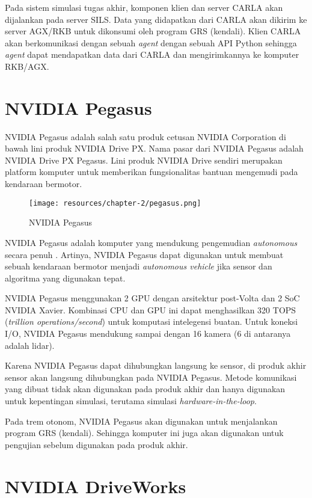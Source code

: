 Pada sistem simulasi tugas akhir, komponen klien dan server CARLA akan
dijalankan pada server SILS. Data yang didapatkan dari CARLA akan dikirim ke
server AGX/RKB untuk dikonsumi oleh program GRS (kendali). Klien CARLA akan
berkomunikasi dengan sebuah \textit{agent} dengan sebuah API Python sehingga
\textit{agent} dapat mendapatkan data dari CARLA dan mengirimkannya ke komputer
RKB/AGX.

\section{NVIDIA Pegasus}\label{chapter-2-section-pegasus}

NVIDIA Pegasus adalah salah satu produk cetusan NVIDIA Corporation di bawah lini
produk NVIDIA Drive PX. Nama pasar dari NVIDIA Pegasus adalah NVIDIA Drive
PX Pegasus. Lini produk NVIDIA Drive sendiri merupakan platform komputer untuk
memberikan fungsionalitas bantuan mengemudi pada kendaraan bermotor.

\begin{figure}[!htbp]
	\centering
	\texttt{[image: resources/chapter-2/pegasus.png]}
	\caption{NVIDIA Pegasus \parencite{trilaksono_laporanRispro}}
\end{figure}

NVIDIA Pegasus adalah komputer yang mendukung pengemudian \textit{autonomous}
secara penuh \parencite{oh_2017}. Artinya, NVIDIA Pegasus dapat digunakan untuk
membuat sebuah kendaraan bermotor menjadi \textit{autonomous vehicle} jika
sensor dan algoritma yang digunakan tepat.

NVIDIA Pegasus menggunakan 2 GPU dengan arsitektur post-Volta dan 2 SoC NVIDIA
Xavier. Kombinasi CPU dan GPU ini dapat menghasilkan 320 TOPS (\textit{trillion
	operations/second}) untuk komputasi intelegensi buatan. Untuk koneksi I/O,
NVIDIA Pegasus mendukung sampai dengan 16 kamera (6 di antaranya adalah lidar).

Karena NVIDIA Pegasus dapat dihubungkan langsung ke sensor, di produk akhir
sensor akan langsung dihubungkan pada NVIDIA Pegasus. Metode komunikasi yang
dibuat tidak akan digunakan pada produk akhir dan hanya digunakan untuk
kepentingan simulasi, terutama simulasi \textit{hardware-in-the-loop}.

Pada trem otonom, NVIDIA Pegasus akan digunakan untuk menjalankan program GRS
(kendali). Sehingga komputer ini juga akan digunakan untuk pengujian sebelum
digunakan pada produk akhir.

\section{NVIDIA DriveWorks}\label{chapter-2-section-driveworks}

